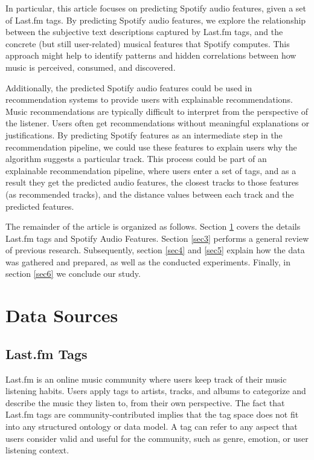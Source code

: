 \documentclass[sn-mathphys]{sn-jnl}%
\theoremstyle{thmstyleone}%
\theoremstyle{thmstyletwo}%
\theoremstyle{thmstylethree}%
\begin{document}
In particular, this article focuses on predicting Spotify audio features, given a set of Last.fm tags.
By predicting Spotify audio features, we explore the relationship between the subjective text descriptions captured by Last.fm tags, and the concrete (but still user-related) musical features that Spotify computes.
This approach might help to identify patterns and hidden correlations between how music is perceived, consumed, and discovered.

Additionally, the predicted Spotify audio features could be used in recommendation systems to provide users with explainable recommendations.
Music recommendations are typically difficult to interpret from the perspective of the listener.
Users often get recommendations without meaningful explanations or justifications.
By predicting Spotify features as an intermediate step in the recommendation pipeline, we could use these features to explain users why the algorithm suggests a particular track.
This process could be part of an explainable recommendation pipeline, where users enter a set of tags,
and as a result they get the predicted audio features, the closest tracks to those features (as recommended tracks), and the distance values between each track and the predicted features.

The remainder of the article is organized as follows.
Section \ref{sec2} covers the details Last.fm tags and Spotify Audio Features.
Section \ref{sec3} performs a general review of previous research.
Subsequently, section \ref{sec4} and \ref{sec5} explain how the data was gathered and prepared, as well as the conducted experiments.
Finally, in section \ref{sec6} we conclude our study.

\section{Data Sources}\label{sec2}

\subsection{Last.fm Tags}

Last.fm is an online music community where users keep track of their music listening habits.
Users apply tags to artists, tracks, and albums to categorize and describe the music they listen to, from their own perspective.
The fact that Last.fm tags are community-contributed implies that the tag space does not fit into any structured ontology or data model.
A tag can refer to any aspect that users consider valid and useful for the community, such as genre,
emotion, or user listening context.
\end{document}
